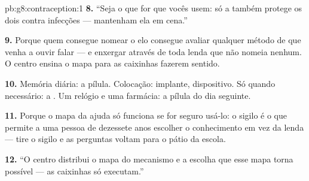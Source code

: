 \begin{solution}{pb:g8:contraception:1}
\textbf{8.} ``Seja o que for que vocês usem: só a  também
protege os dois contra infecções --- mantenham ela em cena.''

\textbf{9.} Porque quem consegue nomear o elo consegue avaliar
qualquer método de que venha a ouvir falar --- e enxergar através de
toda lenda que não nomeia nenhum. O centro ensina o mapa para as
caixinhas fazerem sentido.

\textbf{10.} Memória diária: a pílula. Colocação: implante,
dispositivo. Só quando necessário: a . Um relógio e uma
farmácia: a pílula do dia seguinte.

\textbf{11.} Porque o mapa da ajuda só funciona se for seguro usá-lo:
o sigilo é o que permite a uma pessoa de dezessete anos escolher o
conhecimento em vez da lenda --- tire o sigilo e as perguntas voltam
para o pátio da escola.

\textbf{12.} ``O centro distribui o mapa do mecanismo e a escolha que
esse mapa torna possível --- as caixinhas só executam.''
\end{solution}
